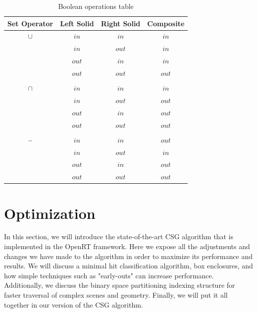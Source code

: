 \documentclass[a4paper,11pt,oneside]{article}
\newcommand{\minus}{\scalebox{0.9}[1.0]{$-$}} %
\begin{document}
\begin{table}[H]
	\centering
	\caption{Boolean operations table}
	\label{section3:boolean_algebra}
	\begin{tabular}{||c c c c||} 
		\hline
		Set Operator & Left Solid & Right Solid & Composite \\ [0.5ex] 
		\hline\hline
		$\cup$       & $in$       & $in$        & $in$      \\
		             & $in$       & $out$       & $in$      \\
		             & $out$      & $in$       & $in$      \\
		             & $out$      & $out$       & $out$     \\
		             &            &             &           \\
		$\cap$       & $in$       & $in$        & $in$      \\
		             & $in$       & $out$       & $out$     \\
		             & $out$      & $in$        & $out$     \\
		             & $out$      & $out$       & $out$     \\
		             &            &             &           \\
		$\minus$     & $in$       & $in$        & $out$     \\
		             & $in$       & $out$       & $in$      \\
		             & $out$      & $in$        & $out$     \\
		             & $out$      & $out$       & $out$     \\		 	   	
		\hline
	\end{tabular}
\end{table}

\section{Optimization}

In this section, we will introduce the state-of-the-art CSG algorithm that is implemented in the OpenRT framework. Here we expose all the adjustments and changes we have made to the algorithm in order to maximize its performance and results. We will discuss a minimal hit classification algorithm, box enclosures, and how simple techniques such as "early-outs" can increase performance. Additionally, we discuss the binary space partitioning indexing structure for faster traversal of complex scenes and geometry. Finally, we will put it all together in our version of the CSG algorithm.
\end{document}
